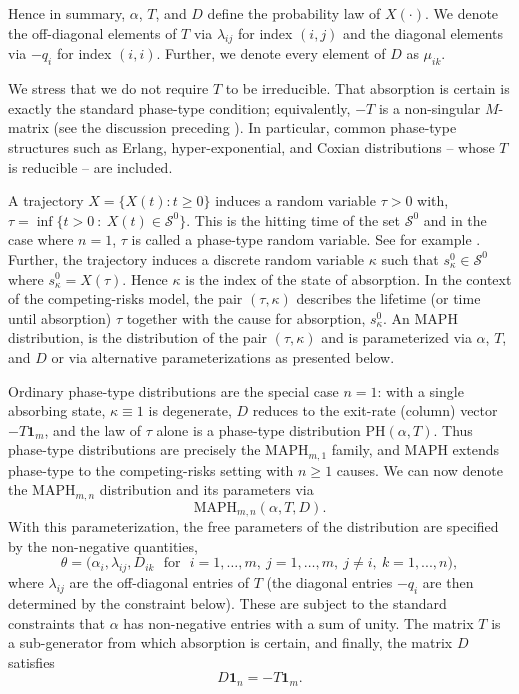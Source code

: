 \documentclass{article}
\newcommand{\cs}{\mathcal{S}}
\begin{document}
Hence in summary, $\alpha$, $T$, and $D$ define the probability law of $X(\cdot)$. We denote the off-diagonal elements of $T$ via $\lambda_{ij}$ for index $(i,j)$ and the diagonal elements via $-q_i$ for index $(i,i)$. Further, we denote every element of $D$ as $\mu_{ik}$.

We stress that we do not require $T$ to be irreducible. That absorption is certain is exactly the standard phase-type condition; equivalently, $-T$ is a non-singular $M$-matrix (see the discussion preceding ). In particular, common phase-type structures such as Erlang, hyper-exponential, and Coxian distributions -- whose $T$ is reducible -- are included.

A trajectory $X=\{X(t):t\geq 0\}$ induces a random variable $\tau > 0$ with, $\tau = \inf\{ t > 0 ~:~ X(t) \in \cs^0\}$. This is the hitting time of the set $\cs^0$ and in the case where $n=1$, $\tau$ is called a phase-type random variable. See for example \citet{he_fundamentals_2014}. Further, the trajectory induces a discrete random variable $\kappa$ such that $s^0_\kappa \in \cs^0$ where $s^0_\kappa = X(\tau)$. Hence $\kappa$ is the index of the state of absorption. In the context of the competing-risks model, the pair $(\tau, \kappa)$ describes the lifetime (or time until absorption) $\tau$ together with the cause for absorption, $s^0_\kappa$. An MAPH distribution, is the distribution of the pair $(\tau, \kappa)$ and is parameterized via $\alpha$, $T$, and $D$ or via alternative parameterizations as presented below.

Ordinary phase-type distributions are the special case $n=1$: with a single absorbing state, $\kappa\equiv1$ is degenerate, $D$ reduces to the exit-rate (column) vector $-T\mathbf{1}_m$, and the law of $\tau$ alone is a phase-type distribution $\mathrm{PH}(\alpha,T)$. Thus phase-type distributions are precisely the $\text{MAPH}_{m,1}$ family, and MAPH extends phase-type to the competing-risks setting with $n\ge1$ causes. We can now denote the $\text{MAPH}_{m,n}$ distribution and its parameters via
%
\begin{equation}
\label{eq:first-param-maph}
\text{MAPH}_{m,n}(\alpha,T,D).
\end{equation}
%
With this parameterization, the free parameters of the distribution are specified by the non-negative quantities,
\begin{equation}
\label{eq:theta-first-param}
    \theta= \big(\alpha_i, \lambda_{ij}, D_{ik}
    ~~~\text{for}~~~
    i=1,\ldots,m, ~j = 1,\ldots,m,~j\neq i,~k = 1,...,n\big),
\end{equation}
%
where $\lambda_{ij}$ are the off-diagonal entries of $T$ (the diagonal entries $-q_i$ are then determined by the constraint below). These are subject to the standard constraints that $\alpha$ has non-negative entries with a sum of unity. The matrix $T$ is a sub-generator from which absorption is certain, and finally, the matrix $D$ satisfies
\begin{equation}
\label{eq:D-matrix-constraint}
D\mathbf{1}_n= - T\mathbf{1}_m.
\end{equation}
\end{document}
